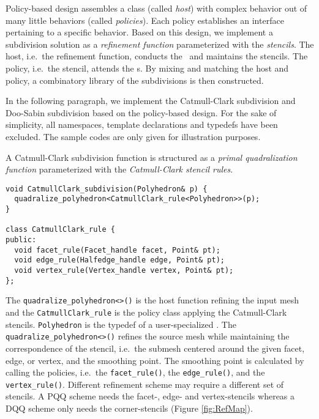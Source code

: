 Policy-based design \cite{Alexandrescu:2001:MCD} assembles a 
class (called \emph{host}) with complex behavior out of many 
little behaviors (called \emph{policies}). Each policy establishes
an interface pertaining to a specific behavior.
Based on this design, we implement a subdivision solution as 
a \emph{refinement function} parameterized with the 
\emph{stencils}. The host, i.e.\ the refinement function,
conducts the \tr\ and maintains the stencils. The policy,
i.e.\ the stencil, attends the \gm s. By mixing and matching
the host and policy, a combinatory library of the subdivisions
is then constructed. 

In the following paragraph, we implement the Catmull-Clark 
subdivision and Doo-Sabin subdivision based on the 
policy-based design. For the sake of simplicity, all 
namespaces, template declarations
and typedefs have been excluded. The sample codes are only
given for illustration purposes.

A Catmull-Clark subdivision function is structured 
as a \emph{primal quadralization function} parameterized 
with the \emph{Catmull-Clark stencil rules}.
\begin{lstlisting}
void CatmullClark_subdivision(Polyhedron& p) {
  quadralize_polyhedron<CatmullClark_rule<Polyhedron>>(p);
}

class CatmullClark_rule {
public:
  void facet_rule(Facet_handle facet, Point& pt);
  void edge_rule(Halfedge_handle edge, Point& pt);
  void vertex_rule(Vertex_handle vertex, Point& pt);
};
\end{lstlisting}
The \lstinline!quadralize_polyhedron<>()! is the host function
refining the input mesh
and the \lstinline!CatmullClark_rule!
is the policy class applying the Catmull-Clark stencils.
\lstinline!Polyhedron! is the typedef of a user-specialized
\cgalpoly . The \lstinline!quadralize_polyhedron<>()!
refines the source mesh while maintaining the 
correspondence of the stencil, i.e.\ the submesh centered 
around the given facet, edge, or
vertex, and the smoothing point. The smoothing point
is calculated by calling the policies, i.e.\
the \lstinline!facet_rule()!, the \lstinline!edge_rule()!,
and the \lstinline!vertex_rule()!.
Different refinement scheme may require a 
different set of stencils. A PQQ scheme needs the
facet-, edge- and vertex-stencils whereas a DQQ scheme 
only needs the corner-stencils (Figure \ref{fig:RefMap}).

